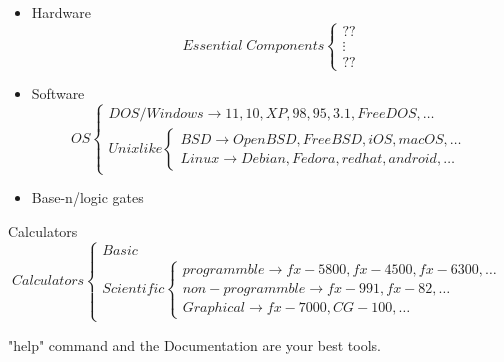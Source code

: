 \documentclass{beamer}
\begin{document}
	\begin{frame}
		\begin{itemize}
			\item Hardware
			\[
				Essential\; Components \begin{cases}
					??\\ \vdots \\ ??
				\end{cases}
			\]
			\item Software  \[OS \begin{cases}
				DOS/Windows \rightarrow 11,10,XP,98,95,3.1, FreeDOS,\dots \\
				Unixlike \begin{cases}
					BSD \rightarrow OpenBSD, FreeBSD, iOS, macOS, \dots \\
					Linux \rightarrow Debian, Fedora, redhat,  android, \dots
				\end{cases}
			\end{cases} \]
			\item Base-n/logic gates
		\end{itemize}
	\end{frame}
	
	\begin{frame}{Calculators}
		\[
		Calculators
		\begin{cases}
			Basic  \\
			Scientific
				\begin{cases}
					programmble\rightarrow fx-5800, fx-4500, fx-6300, \dots \\
					non-programmble \rightarrow fx-991, fx-82, \dots \\
					Graphical \rightarrow fx-7000,CG-100, \dots
				\end{cases}  
		\end{cases}
		\]
	\end{frame}
	
	\begin{frame}
		\Large
		"help" command and the Documentation are your best tools.
	\end{frame}
	
\end{document}
